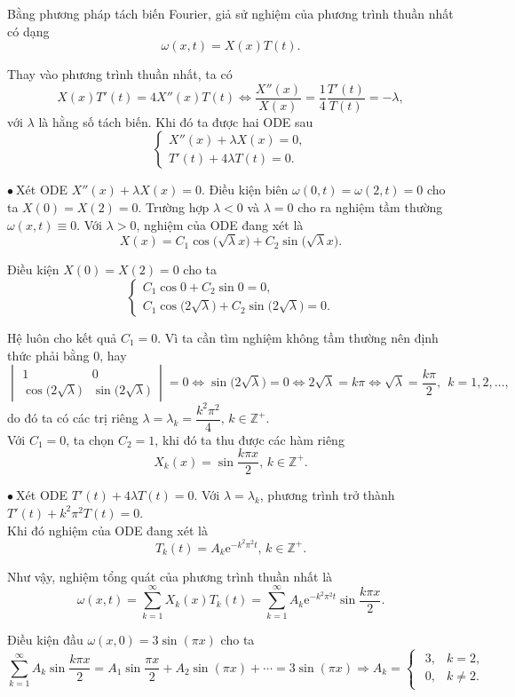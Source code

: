 \documentclass[10pt, a4paper]{article}
\begin{document}
	Bằng phương pháp tách biến Fourier, giả sử nghiệm của phương trình thuần nhất có dạng $$\omega(x,t)=X(x)T(t).$$
	
	Thay vào phương trình thuần nhất, ta có $$X(x)T'(t)=4X''(x)T(t)\iff\frac{X''(x)}{X(x)}=\frac14\frac{T'(t)}{T(t)}=-\lambda,$$
	với $\lambda$ là hằng số tách biến. Khi đó ta được hai ODE sau $$\begin{cases}
		X''(x)+\lambda X(x)=0,\\
		T'(t)+4\lambda T(t)=0.
	\end{cases}$$
	
	$\bullet~$Xét ODE $X''(x)+\lambda X(x)=0$. Điều kiện biên $\omega(0,t)=\omega(2,t)=0$ cho ta $X(0)=X(2)=0$. Trường hợp $\lambda<0$ và $\lambda=0$ cho ra nghiệm tầm thường $\omega(x,t)\equiv0$. Với $\lambda>0$, nghiệm của ODE đang xét là $$X(x)=C_1\cos\big(\sqrt\lambda x\big)+C_2\sin\big(\sqrt\lambda x\big).$$
	
	Điều kiện $X(0)=X(2)=0$ cho ta $$\begin{cases}
		C_1\cos0+C_2\sin0=0,\\
		C_1\cos\big(2\sqrt\lambda\big)+C_2\sin\big(2\sqrt\lambda\big)=0.
	\end{cases}$$
	
	Hệ luôn cho kết quả $C_1=0$. Vì ta cần tìm nghiệm không tầm thường nên định thức phải bằng 0, hay $$\begin{vmatrix}
		1&0\\
		\cos\big(2\sqrt\lambda\big)&\sin\big(2\sqrt\lambda\big)
	\end{vmatrix}=0\iff\sin\big(2\sqrt\lambda\big)=0\iff2\sqrt\lambda=k\pi\iff\sqrt\lambda=\frac{k\pi}{2},~~k=1,2,\ldots,$$
	do đó ta có các trị riêng $\lambda=\lambda_k=\dfrac{k^2\pi^2}{4},\,k\in\mathbb Z^+$.\\
	
	Với $C_1=0$, ta chọn $C_2=1$, khi đó ta thu được các hàm riêng $$X_k(x)=\sin\frac{k\pi x}{2},\,k\in\mathbb Z^+.$$
	
	$\bullet~$Xét ODE $T'(t)+4\lambda T(t)=0$. Với $\lambda=\lambda_k$, phương trình trở thành $T'(t)+k^2\pi^2T(t)=0$.\\
	
	Khi đó nghiệm của ODE đang xét là $$T_k(t)=A_k\mathrm e^{-k^2\pi^2t},\,k\in\mathbb Z^+.$$
	
	Như vậy, nghiệm tổng quát của phương trình thuần nhất là $$\omega(x,t)=\sum_{k=1}^\infty X_k(x)T_k(t)=\sum_{k=1}^\infty A_k\mathrm e^{-k^2\pi^2t}\sin\frac{k\pi x}{2}.$$
	
	Điều kiện đầu $\omega(x,0)=3\sin(\pi x)$ cho ta $$\sum_{k=1}^\infty A_k\sin\frac{k\pi x}{2}=A_1\sin\frac{\pi x}{2}+A_2\sin(\pi x)+\cdots=3\sin(\pi x)\Rightarrow A_k=\begin{cases}
		\begin{array}{ll}
			3, & k=2, \\
			0, & k\ne2.
		\end{array}
	\end{cases}$$
	
\end{document}
